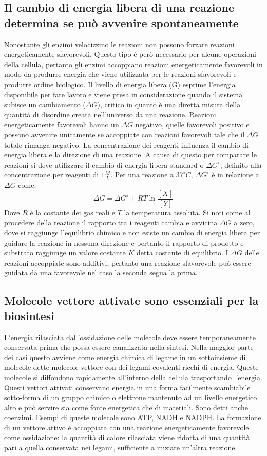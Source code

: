 \subsection{Il cambio di energia libera di una reazione determina se pu\`o avvenire spontaneamente}
Nonostante gli enzimi velocizzino le reazioni non possono forzare reazioni energeticamente sfavorevoli. Questo tipo \`e per\`o necessario per alcune operazioni della cellula, pertanto
gli enzimi accoppiano reazioni energeticamente favorevoli in modo da produrre energia che viene utilizzata per le reazioni sfavorevoli e produrre ordine biologico. Il livello di energia
libera (G) esprime l'energia disponibile per fare lavoro e viene presa in considerazione quando il sistema subisce un cambiamento ($\Delta G$), critico in quanto \`e una diretta misura
della quantit\`a di disordine creata nell'universo da una reazione. Reazioni energeticamente favorevoli hanno un $\Delta G$ negativo, quelle favorevoli positivo e possono avvenire 
unicamente se accoppiate con reazioni favorevoli tale che il $\Delta G$ totale rimanga negativo. La concentrazione dei reagenti influenza il cambio di energia libera e la direzione di 
una reazione. A causa di questo per comparare le reazioni si deve utilizzare il cambio di energia libera standard o $\Delta G^{\circ}$, definito alla concentrazione per reagenti di
$1\frac{M}{L}$. Per una reazione  a $37^\circ C$, $\Delta G^\circ$ \`e in relazione a $\Delta G$ come:
$$\Delta G = \Delta G^\circ + RT\ln\dfrac{[X]}{[Y]}$$
Dove $R$ \`e la costante dei gas reali e $T$ la temperatura assoluta. Si noti come al procedere della reazione il rapporto tra i reagenti cambia e avvicina $\Delta G$ a zero, dove si 
raggiunge l'equilibrio chimico e non esiste un cambio di energia libera per guidare la reazione in nessuna direzione e pertanto il rapporto di prodotto e substrato raggiunge un valore
costante $K$ detta costante di equilibrio. I $\Delta G$ delle reazioni accoppiate sono additivi, pertanto una reazione sfavorevole pu\`o essere guidata da una favorevole nel caso la 
seconda segua la prima. 
\subsection{Molecole vettore attivate sono essenziali per la biosintesi}
L'energia rilasciata dall'ossidazione delle molecole deve essere temporaneamente conservata prima che possa essere canalizzata nella sintesi. Nella maggior parte dei casi questo avviene
come energia chimica di legame in un sottoinsieme di molecole dette molecole vettore con dei legami covalenti ricchi di energia. Queste molecole si diffondono rapidamente all'interno 
della cellula trasportando l'energia. Questi vettori attivati conservano energia in una forma facilmente scambiabile sotto-forma di un gruppo chimico o elettrone mantenuto ad un livello
energetico alto e pu\`o servire sia come fonte energetica che di materiali. Sono detti anche coenzimi. Esempi di queste molecole sono ATP, NADH e NADPH. La formazione di un vettore 
attivo \`e accoppiata con una reazione energeticamente favorevole come ossidazione: la quantit\`a di calore rilasciata viene ridotta di una quantit\`a pari a quella conservata nei 
legami, sufficiente a iniziare un'altra reazione.
